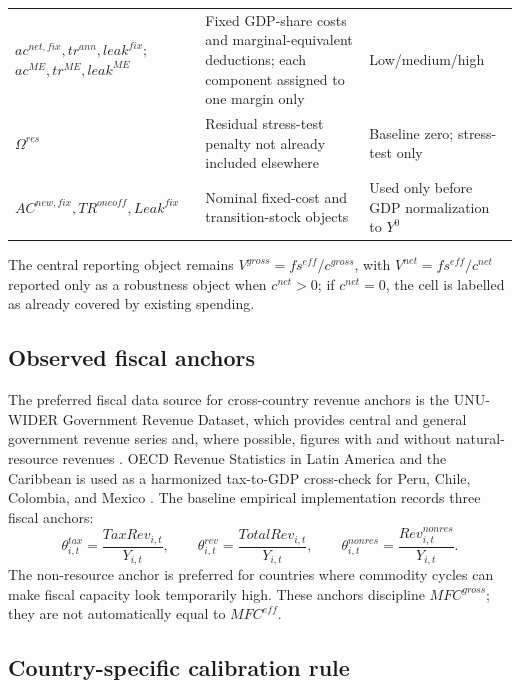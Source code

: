 \documentclass[11pt,a4paper]{article}
\begin{document}
\begin{longtable}{>{\raggedright\arraybackslash}p{}>{\raggedright\arraybackslash}p{}>{\raggedright\arraybackslash}p{}}
$ac^{net,fix},tr^{ann},leak^{fix}$; $ac^{ME},tr^{ME},leak^{ME}$ & Fixed GDP-share costs and marginal-equivalent deductions; each component assigned to one margin only & Low/medium/high \\
$\Omega^{res}$ & Residual stress-test penalty not already included elsewhere & Baseline zero; stress-test only \\
$AC^{new,fix},TR^{oneoff},Leak^{fix}$ & Nominal fixed-cost and transition-stock objects & Used only before GDP normalization to $Y^0$ \\
\bottomrule
\end{longtable}

The central reporting object remains $V^{gross}=fs^{eff}/c^{gross}$, with $V^{net}=fs^{eff}/c^{net}$ reported only as a robustness object when $c^{net}>0$; if $c^{net}=0$, the cell is labelled as already covered by existing spending.

\subsection{Observed fiscal anchors}\label{subsec:observed_fiscal_anchors}

The preferred fiscal data source for cross-country revenue anchors is the UNU-WIDER Government Revenue Dataset, which provides central and general government revenue series and, where possible, figures with and without natural-resource revenues \citep{unu2025grd}. OECD Revenue Statistics in Latin America and the Caribbean is used as a harmonized tax-to-GDP cross-check for Peru, Chile, Colombia, and Mexico \citep{oecd2025revenue}. The baseline empirical implementation records three fiscal anchors:
\begin{equation}
    \theta^{tax}_{i,t}=\frac{TaxRev_{i,t}}{Y_{i,t}},\qquad
    \theta^{rev}_{i,t}=\frac{TotalRev_{i,t}}{Y_{i,t}},\qquad
    \theta^{nonres}_{i,t}=\frac{Rev^{nonres}_{i,t}}{Y_{i,t}}.
\end{equation}
The non-resource anchor is preferred for countries where commodity cycles can make fiscal capacity look temporarily high. These anchors discipline $MFC^{gross}$; they are not automatically equal to $MFC^{eff}$.

\subsection{Country-specific calibration rule}
\end{document}
